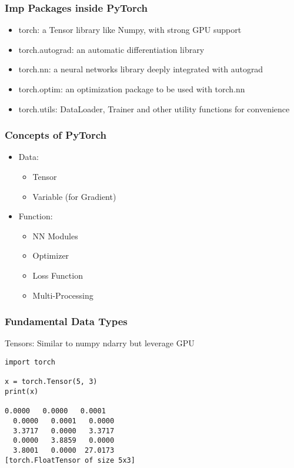 \begin{frame}[fragile] \frametitle{Imp Packages inside PyTorch}
\begin{itemize}
\item  torch: a Tensor library like Numpy, with strong GPU support
\item torch.autograd: an automatic differentiation library 
\item torch.nn: a neural networks library deeply integrated with autograd 
\item torch.optim: an optimization package to be used with torch.nn
\item torch.utils: DataLoader, Trainer and other utility functions for convenience
\end{itemize}
\end{frame}


\begin{frame}[fragile] \frametitle{Concepts of PyTorch}
\begin{itemize}
\item Data:
\begin{itemize}
\item  Tensor
\item Variable (for Gradient)
\end{itemize}
\item Function:
\begin{itemize}
\item   NN Modules
\item   Optimizer
\item   Loss Function
\item   Multi-Processing
\end{itemize}
\end{itemize}
\end{frame}




\begin{frame}[fragile] \frametitle{Fundamental Data Types}
Tensors: Similar to numpy ndarry but leverage GPU
\begin{lstlisting}
import torch

x = torch.Tensor(5, 3)
print(x)

0.0000   0.0000   0.0001
  0.0000   0.0001   0.0000
  3.3717   0.0000   3.3717
  0.0000   3.8859   0.0000
  3.8001   0.0000  27.0173
[torch.FloatTensor of size 5x3]
\end{lstlisting}
\end{frame}

